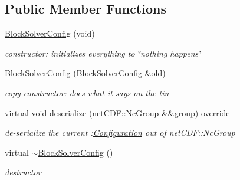 \subsection*{Public Member Functions}
\begin{DoxyCompactItemize}
\item 
\mbox{\label{class_s_m_spp__di__unipi__it_1_1_block_solver_config_a3f7cefa710a7113869cba6b0031b2f94}} 
\mbox{\hyperlink{class_s_m_spp__di__unipi__it_1_1_block_solver_config_a3f7cefa710a7113869cba6b0031b2f94}{Block\+Solver\+Config}} (void)
\begin{DoxyCompactList}\small\item\em constructor\+: initializes everything to \char`\"{}nothing happens\char`\"{} \end{DoxyCompactList}\item 
\mbox{\label{class_s_m_spp__di__unipi__it_1_1_block_solver_config_aa2fdd9ca7b7adf05ea85c2b2080e5dc2}} 
\mbox{\hyperlink{class_s_m_spp__di__unipi__it_1_1_block_solver_config_aa2fdd9ca7b7adf05ea85c2b2080e5dc2}{Block\+Solver\+Config}} (\mbox{\hyperlink{class_s_m_spp__di__unipi__it_1_1_block_solver_config}{Block\+Solver\+Config}} \&old)
\begin{DoxyCompactList}\small\item\em copy constructor\+: does what it says on the tin \end{DoxyCompactList}\item 
virtual void \mbox{\hyperlink{class_s_m_spp__di__unipi__it_1_1_block_solver_config_a828ece608e8a4a497f43d3d6bb75af40}{deserialize}} (net\+C\+D\+F\+::\+Nc\+Group \&\&group) override
\begin{DoxyCompactList}\small\item\em de-\/serialize the current \+:\mbox{\hyperlink{class_s_m_spp__di__unipi__it_1_1_configuration}{Configuration}} out of net\+C\+D\+F\+::\+Nc\+Group \end{DoxyCompactList}\item 
\mbox{\label{class_s_m_spp__di__unipi__it_1_1_block_solver_config_ad529e7e19b3dad056bab2b2f04478ad7}} 
virtual \mbox{\hyperlink{class_s_m_spp__di__unipi__it_1_1_block_solver_config_ad529e7e19b3dad056bab2b2f04478ad7}{$\sim$\+Block\+Solver\+Config}} ()
\begin{DoxyCompactList}\small\item\em destructor \end{DoxyCompactList}\item 

\end{DoxyCompactItemize}
